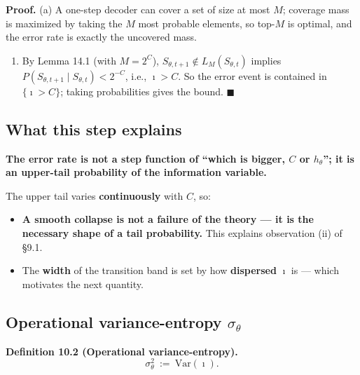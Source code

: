 \documentclass[11pt]{article}
\providecommand{\tightlist}{%
  \setlength{\itemsep}{0pt}\setlength{\parskip}{0pt}}
\renewenvironment{quote}
  {\def\FrameCommand{{\color{gray!60}\vrule width 2pt}\hspace{8pt}}%
   \MakeFramed{\advance\hsize-\width \FrameRestore}\begin{itshape}}
  {\end{itshape}\endMakeFramed}
\begin{document}
\textbf{Proof.} (a) A one-step decoder can cover a set of size at most \(M\); coverage mass is maximized by taking the \(M\) most probable elements, so top-\(M\) is optimal, and the error rate is exactly the uncovered mass.

\begin{enumerate}
\def\labelenumi{(\alph{enumi})}
\setcounter{enumi}{1}
\tightlist
\item
  By Lemma 14.1 (with \(M=2^C\)), \(S_{\theta,t+1}\notin L_M(S_{\theta,t})\) implies \(P(S_{\theta,t+1}\mid S_{\theta,t})<2^{-C}\), i.e., \(\imath>C\). So the error event is contained in \(\{\imath>C\}\); taking probabilities gives the bound. \(\blacksquare\)
\end{enumerate}

\hypertarget{what-this-step-explains}{%
\subsection{What this step explains}\label{what-this-step-explains}}

\begin{quote}
\textbf{The error rate is not a step function of ``which is bigger, \(C\) or \(h_\theta\)''; it is an upper-tail probability of the information variable.}
\end{quote}

The upper tail varies \textbf{continuously} with \(C\), so:

\begin{itemize}
\tightlist
\item
  \textbf{A smooth collapse is not a failure of the theory --- it is the necessary shape of a tail probability.} This explains observation (ii) of \S{}9.1.
\item
  The \textbf{width} of the transition band is set by how \textbf{dispersed} \(\imath\) is --- which motivates the next quantity.
\end{itemize}

\hypertarget{operational-variance-entropy-sigma_theta}{%
\subsection{\texorpdfstring{Operational variance-entropy \(\sigma_\theta\)}{Operational variance-entropy \textbackslash sigma\_\textbackslash theta}}\label{operational-variance-entropy-sigma_theta}}

\begin{quote}
\textbf{Definition 10.2 (Operational variance-entropy).}
\[\sigma_\theta^2\ :=\ \mathrm{Var}(\imath).\]
\end{quote}
\end{document}
